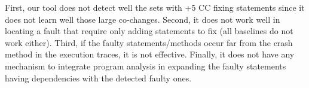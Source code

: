 
\vspace{3pt}
First, our tool does not detect well the sets with +5 CC fixing statements
since it does not learn well those large co-changes. Second, it
does not work well in locating a fault that require only adding
statements to fix (all baselines do not work either).
Third, if the faulty statements/methods occur far from the crash
method in the execution traces, it is not effective.
Finally, it does not have any mechanism to integrate program analysis
in expanding the faulty statements having dependencies with the
detected faulty ones.




